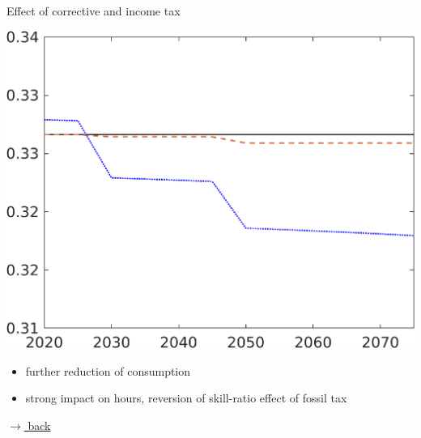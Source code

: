 \documentclass[11pt,aspectratio=169]{beamer}
\begin{document}
\begin{frame}{Effect of corrective and income tax}
\begin{minipage}[]{0.3\textwidth}
	\end{minipage}
	\begin{minipage}[]{0.3\textwidth}
		\includegraphics[width=1\textwidth]{../codding_model/own_basedOnFried/optimalPol_elastS_DisuSci/figures/all_1705/CompCounterFac_withLF_taufopt1_taulopt0_hl_spillover0_noskill0_sep1_BN0_ineq0_red0_xgrowth0_etaa0.79_lgd0.png}
	\end{minipage}
	
	\vspace{3mm}
	\begin{itemize}
		\item further reduction of consumption 
		\item strong impact on hours, reversion of skill-ratio effect of fossil tax
		\end{itemize}
	
	
	\vspace{-1mm}
	\hfill
	\hyperlink{effalloback}{\tiny{$\rightarrow$ back}} 
\end{frame}
\end{document}
